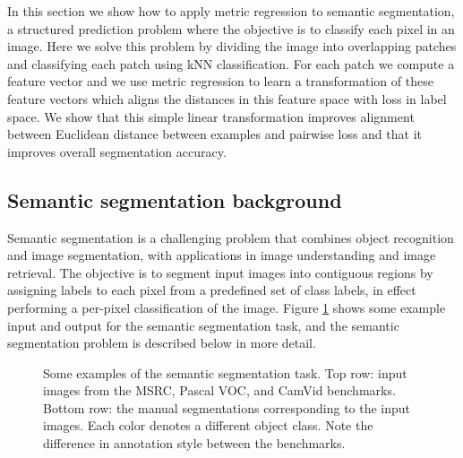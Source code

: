 \documentclass[a4paper,titlepage]{article}
\begin{document}
In this section we show how to apply metric regression to semantic segmentation, a structured prediction problem where the objective is to classify each pixel in an image. Here we solve this problem by dividing the image into overlapping patches and classifying each patch using \ac{kNN} classification. For each patch we compute a feature vector and we use metric regression to learn a transformation of these feature vectors which aligns the distances in this feature space with loss in label space. We show that this simple linear transformation improves alignment between Euclidean distance between examples and pairwise loss and that it improves overall segmentation accuracy.



\subsection{Semantic segmentation background}

Semantic segmentation is a challenging problem that combines object recognition and image segmentation, with applications in image understanding and image retrieval. The objective is to segment input images into contiguous regions by assigning labels to each pixel from a predefined set of class labels, in effect performing a per-pixel classification of the image. Figure \ref{fig:segmentation_examples} shows some example input and output for the semantic segmentation task, and the semantic segmentation problem is described below in more detail.

\begin{figure}[tbh]
\begin{center}
\caption{Some examples of the semantic segmentation task. Top row: input images from the MSRC, Pascal VOC, and CamVid benchmarks. Bottom row: the manual segmentations corresponding to the input images. Each color denotes a different object class. Note the difference in annotation style between the benchmarks.}
\label{fig:segmentation_examples}
\end{center}
\end{figure}
\end{document}
